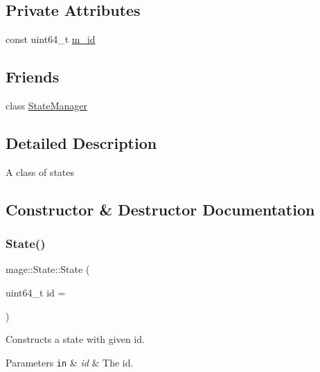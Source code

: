 \subsection*{Private Attributes}
\begin{DoxyCompactItemize}
\item 
const uint64\+\_\+t \hyperlink{classmage_1_1_state_ab135514ec2250e9680b35cfab4e91cab}{m\+\_\+id}
\end{DoxyCompactItemize}
\subsection*{Friends}
\begin{DoxyCompactItemize}
\item 
class \hyperlink{classmage_1_1_state_a8055e77bf0267832ef337718a11fec0d}{State\+Manager}
\end{DoxyCompactItemize}


\subsection{Detailed Description}
A class of states 

\subsection{Constructor \& Destructor Documentation}
\hypertarget{classmage_1_1_state_ac21bb6de22bb3b9c1b18d98b53e92100}{}\label{classmage_1_1_state_ac21bb6de22bb3b9c1b18d98b53e92100} 
\subsubsection{\texorpdfstring{State()}{State()}\hspace{0.1cm}{\footnotesize\ttfamily [1/2]}}
{\footnotesize\ttfamily mage\+::\+State\+::\+State (\begin{DoxyParamCaption}\item[{uint64\+\_\+t}]{id = {} }\end{DoxyParamCaption})}

Constructs a state with given id.


\begin{DoxyParams}[1]{Parameters}
\mbox{\tt in}  & {\em id} & The id. \\
\hline
\end{DoxyParams}
\hypertarget{classmage_1_1_state_aa970b0dd628870e72a7f7fffcff1db13}{}\label{classmage_1_1_state_aa970b0dd628870e72a7f7fffcff1db13} 
